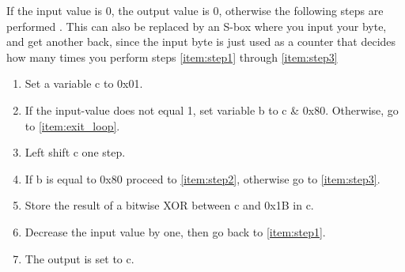If the input value is 0, the output value is 0, otherwise the 
following steps are performed \citep{RijndaelKeySchedule}. This can 
also be replaced by an S-box where you input your byte, and get 
another back, since the input byte is just used as a counter that 
decides how many times you perform steps \ref{item:step1} through 
\ref{item:step3} 

\begin{enumerate}
\item Set a variable c to 0x01.
\item If the input-value does not equal 1, set variable b to c 
  \& 0x80. Otherwise, go to \ref{item:exit_loop}. 
  \label{item:step1}
\item Left shift c one step.
\item If b is equal to 0x80 proceed to \ref{item:step2}, otherwise go to
  \ref{item:step3}.
\item Store the result of a bitwise XOR between c and 0x1B in c.
  \label{item:step2}
\item Decrease the input value by one, then go back to  
  \ref{item:step1}.
  \label{item:step3}
\item The output is set to c.
  \label{item:exit_loop}
\end{enumerate}
